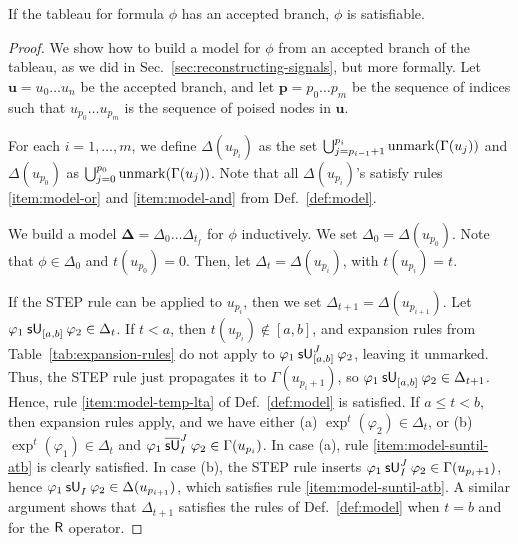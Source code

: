 \documentclass[acmsmall,screen]{acmart}
\begin{document}
\begin{theorem}[Soundness]
\label{thm:soundness}
If the tableau for formula $\phi$ has an accepted branch, $\phi$ is satisfiable.
\end{theorem}
\begin{proof}
We show how to build a model for $\phi$ from an accepted branch of the tableau,
as we did in Sec.~\ref{sec:reconstructing-signals}, but more formally.
Let $\mathbf{u} = u_0 \dots u_n$ be the accepted branch,
and let $\textbf{p} = p_0 \dots p_m$ be the sequence of indices
such that $u_{p_0} \dots u_{p_m}$ is the sequence of poised nodes in $\mathbf{u}$.

For each $i = 1, \dots, m$, we define $\Delta(u_{p_i})$
as the set $\bigcup_{j = p_{i-1} + 1}^{p_i} \unmark(\Gamma(u_j))$ 
and $\Delta(u_{p_0})$ as $\bigcup_{j = 0}^{p_0} \unmark(\Gamma(u_j))$.
Note that all $\Delta(u_{p_i})$'s satisfy rules \ref{item:model-or} and \ref{item:model-and}
from Def.~\ref{def:model}.

We build a model $\mathbf{\Delta} = \Delta_0 \dots \Delta_{t_f}$ for $\phi$ inductively.
We set $\Delta_0 = \Delta(u_{p_0})$.
Note that $\phi \in \Delta_0$ and $t(u_{p_0}) = 0$.
Then, let $\Delta_t = \Delta(u_{p_i})$, with $t(u_{p_i}) = t$.

If the \textsf{STEP} rule can be applied to $u_{p_i}$, then we set $\Delta_{t+1} = \Delta(u_{p_{i+1}})$.
Let $\suntil{[a,b]}{\varphi_1}{\varphi_2} \in \Delta_t$.
If $t < a$, then $t(u_{p_i}) \not\in [a,b]$, and expansion rules from Table~\ref{tab:expansion-rules}
do not apply to $\suntil[J]{[a,b]}{\varphi_1}{\varphi_2}$, leaving it unmarked.
Thus, the \textsf{STEP} rule just propagates it to $\Gamma(u_{p_i+1})$,
so $\suntil{[a,b]}{\varphi_1}{\varphi_2} \in \Delta_{t+1}$.
Hence, rule \ref{item:model-temp-lta} of Def.~\ref{def:model} is satisfied.
If $a \leq t < b$, then expansion rules apply, and we have either
(a) $\exp^t(\varphi_2) \in \Delta_t$,
or (b) $\exp^t(\varphi_1) \in \Delta_t$ and $\msuntil[J]{I}{\varphi_1}{\varphi_2} \in \Gamma(u_{p_i})$.
In case (a), rule \ref{item:model-suntil-atb} is clearly satisfied.
In case (b), the \textsf{STEP} rule inserts $\suntil[J]{I}{\varphi_1}{\varphi_2} \in \Gamma(u_{p_i + 1})$,
hence $\suntil{I}{\varphi_1}{\varphi_2} \in \Delta(u_{p_{i+1}})$,
which satisfies rule \ref{item:model-suntil-atb}.
A similar argument shows that $\Delta_{t+1}$ satisfies the rules of Def.~\ref{def:model}
when $t = b$ and for the $\releaseop$ operator.


\end{proof}
\end{document}

